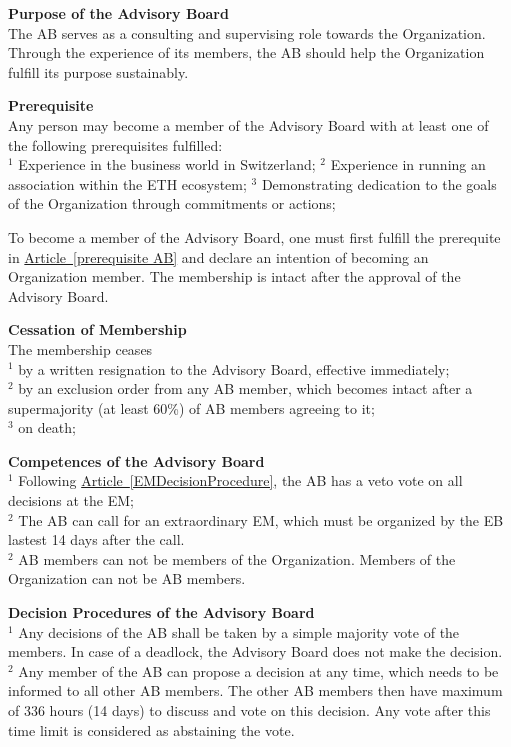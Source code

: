 \documentclass[10pt]{article}
\newcounter{qcounter}
\begin{document}
\begin{list}{{\bf Article :~}}{}
\item {\bf Purpose of the Advisory Board}\label{AB}\\
The AB serves as a consulting and supervising role towards the Organization. Through the experience of its members, the AB should help the Organization fulfill its purpose sustainably. 

\item {\bf Prerequisite}\label{prerequisite AB}\\
Any person may become a member of the Advisory Board with at least one of the following prerequisites fulfilled:\\
$^{1}$ Experience in the business world in Switzerland;
$^{2}$ Experience in running an association within the ETH ecosystem; 
$^{3}$ Demonstrating dedication to the goals of the Organization through commitments or actions; 
 

To become a member of the Advisory Board, one must first fulfill the prerequite in \hyperref[prerequisite AB]{Article~\ref{prerequisite AB}} and declare an intention of becoming an Organization member. The membership is intact after the approval of the Advisory Board. 

\item {\bf Cessation of Membership}\\
The membership ceases\\
$^{1}$ by a written resignation to the Advisory Board, effective immediately;\\
$^{2}$ by an exclusion order from any AB member, which becomes intact after a supermajority (at least 60\%) of AB members agreeing to it;\\
$^{3}$ on death; 

\item {\bf Competences of the Advisory Board}\\
$^{1}$ Following \hyperref[EMDecisionProcedure]{Article~\ref{EMDecisionProcedure}}, the AB has a veto vote on all decisions at the EM;\\
$^{2}$ The AB can call for an extraordinary EM, which must be organized by the EB lastest 14 days after the call.\\
$^{2}$ AB members can not be members of the Organization. Members of the Organization can not be AB members.

\item {\bf Decision Procedures of the Advisory Board}\\
$^{1}$ Any decisions of the AB shall be taken by a simple majority vote of the members. In case of a deadlock, the Advisory Board does not make the decision. \\
$^{2}$ Any member of the AB can propose a decision at any time, which needs to be informed to all other AB members. The other AB members then have maximum of 336 hours (14 days) to discuss and vote on this decision. Any vote after this time limit is considered as abstaining the vote.  



\end{list}
\end{document}
